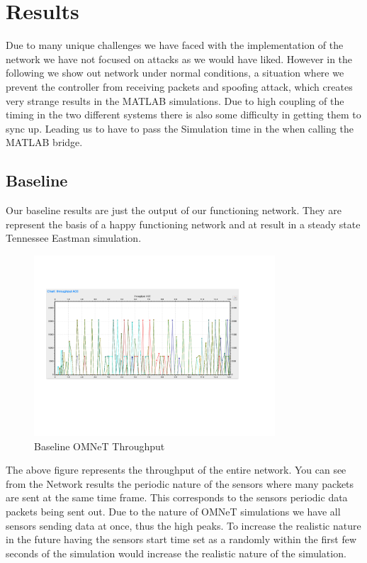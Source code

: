 \section{Results}
Due to many unique challenges we have faced with the implementation of the network we have not focused on attacks as we would have liked. However in the following we show out network under normal conditions, a situation where we prevent the controller from receiving packets and spoofing attack, which creates very strange results in the MATLAB simulations. Due to high coupling of the timing in the two different systems there is also some difficulty in getting them to sync up. Leading us to have to pass the Simulation time in the when calling the MATLAB bridge. 
 
\subsection{Baseline}

Our baseline results are just the output of our functioning network. They are represent the basis of a happy functioning network and at result in a steady state Tennessee Eastman simulation. 

\begin{figure}[ht!]
        \centering
		\includegraphics[width=90mm]{figs/Baseline_Omnet.png}
        \caption{Baseline OMNeT Throughput}
        \label{fig:BaselineOMNeT}        
\end{figure}

The above figure represents the throughput of the entire network. You can see from the Network results the periodic nature of the sensors where many packets are sent at the same time frame. This corresponds to the sensors periodic data packets being sent out. Due to the nature of OMNeT simulations we have all sensors sending data at once, thus the high peaks. To increase the realistic nature in the future having the sensors start time set as a randomly within the first few seconds of the simulation would increase the realistic nature of the simulation. 

